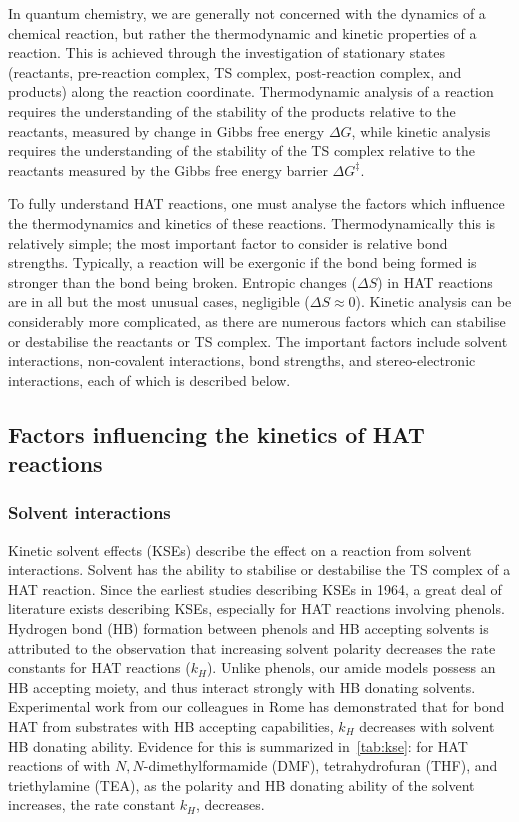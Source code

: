 In quantum chemistry, we are generally not concerned with the dynamics of a
chemical reaction, but rather the thermodynamic and kinetic properties of a
reaction. This is achieved through the investigation of stationary states
(reactants, pre-reaction complex, TS complex, post-reaction complex, and
products) along the reaction coordinate. Thermodynamic analysis of a reaction
requires the understanding of the stability of the products relative to the
reactants, measured by change in Gibbs free energy $\Delta G$, while kinetic
analysis requires the understanding of the stability of the TS complex relative
to the reactants measured by the Gibbs free energy
barrier $\Delta G^{\ddagger}$.

To fully understand HAT reactions, one must analyse the factors which influence
the thermodynamics and kinetics of these reactions. Thermodynamically this is
relatively simple; the most important factor to consider is relative bond
strengths. Typically, a reaction will be exergonic if the bond being formed is
stronger than the bond being broken. Entropic changes ($\Delta S$) in HAT
reactions are in all but the most unusual cases, negligible
($\Delta S \approx 0$).\cite{Mader2007} Kinetic analysis can be considerably
more complicated, as there are numerous factors which can stabilise or
destabilise the reactants or TS complex. The important factors include solvent
interactions, non-covalent interactions, bond strengths, and stereo-electronic
interactions, each of which is described below.

\subsection{Factors influencing the kinetics of HAT reactions}

\subsubsection{Solvent interactions}

Kinetic solvent effects (KSEs) describe the effect on a reaction from solvent
interactions. Solvent has the ability to stabilise or destabilise the TS complex
of a HAT reaction. Since the earliest studies describing KSEs in
1964,\cite{Howard1964} a great deal of literature exists describing KSEs,
especially for HAT reactions involving phenols.\cite{note2} Hydrogen bond (HB)
formation between phenols and HB accepting solvents is attributed to the
observation that increasing solvent polarity decreases the rate constants for
HAT reactions ($k_H$). Unlike phenols, our amide models possess an HB accepting
moiety, and thus interact strongly with HB donating solvents. Experimental work
from our colleagues in Rome has demonstrated that for  bond HAT from
substrates with HB accepting capabilities, $k_H$ decreases with solvent HB
donating ability. Evidence for this is summarized in~\ref{tab:kse}: for HAT
reactions of \cumo with $N,N$-dimethylformamide (DMF), tetrahydrofuran (THF),
and triethylamine (TEA), as the polarity and HB donating ability of the solvent
increases, the rate constant $k_H$, decreases.



